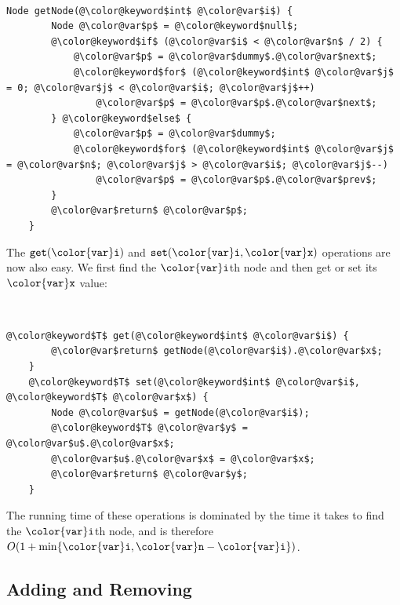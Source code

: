 \documentclass[10pt]{book}
\theoremstyle{plain}
\theoremstyle{definition}
\begin{document}
 \ \vspace{.5ex}\begin{Verbatim}[gobble=1,tabsize=2,frame=single,framerule=1.2pt,commandchars=\\@\$,label=\texttt{DLList},labelposition=topline]
	Node getNode(@\color@keyword$int$ @\color@var$i$) {
		Node @\color@var$p$ = @\color@keyword$null$;
		@\color@keyword$if$ (@\color@var$i$ < @\color@var$n$ / 2) {
			@\color@var$p$ = @\color@var$dummy$.@\color@var$next$;
			@\color@keyword$for$ (@\color@keyword$int$ @\color@var$j$ = 0; @\color@var$j$ < @\color@var$i$; @\color@var$j$++)
				@\color@var$p$ = @\color@var$p$.@\color@var$next$;
		} @\color@keyword$else$ {
			@\color@var$p$ = @\color@var$dummy$;
			@\color@keyword$for$ (@\color@keyword$int$ @\color@var$j$ = @\color@var$n$; @\color@var$j$ > @\color@var$i$; @\color@var$j$--)
				@\color@var$p$ = @\color@var$p$.@\color@var$prev$;
		}
		@\color@var$return$ @\color@var$p$;
	}
\end{Verbatim}


The \ensuremath{\mathtt{get({\color{var}i})}} and \ensuremath{\mathtt{set({\color{var}i},{\color{var}x})}} operations are now also easy.  We first find the \ensuremath{\mathtt{{\color{var}i}}}th node and then get or set its \ensuremath{\mathtt{{\color{var}x}}} value:



 \ \vspace{.5ex}\begin{Verbatim}[gobble=1,tabsize=2,frame=single,framerule=1.2pt,commandchars=\\@\$,label=\texttt{DLList},labelposition=topline]
	@\color@keyword$T$ get(@\color@keyword$int$ @\color@var$i$) {
		@\color@var$return$ getNode(@\color@var$i$).@\color@var$x$;
	}
	@\color@keyword$T$ set(@\color@keyword$int$ @\color@var$i$, @\color@keyword$T$ @\color@var$x$) {
		Node @\color@var$u$ = getNode(@\color@var$i$);
		@\color@keyword$T$ @\color@var$y$ = @\color@var$u$.@\color@var$x$;
		@\color@var$u$.@\color@var$x$ = @\color@var$x$;
		@\color@var$return$ @\color@var$y$;
	}
\end{Verbatim}


The running time of these operations is dominated by the time it takes
to find the \ensuremath{\mathtt{{\color{var}i}}}th node, and is therefore $O(1+\min\{\ensuremath{\mathtt{{\color{var}i}}},\ensuremath{\mathtt{{\color{var}n}}}-\ensuremath{\mathtt{{\color{var}i}}}\})$.

\subsection{Adding and Removing}
\end{document}
